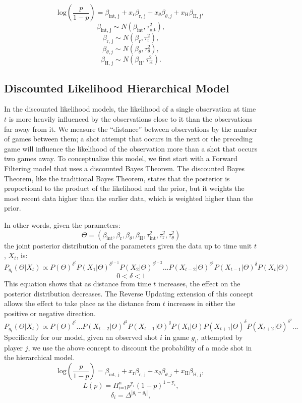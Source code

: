 \documentclass[12pt,twoside]{dukestatscithesis}
\theoremstyle{definition}
\theoremstyle{definition}
\theoremstyle{definition}
\theoremstyle{remark}
\begin{document}
\[
\text{log} \left( \frac{p}{1-p} \right) = 
\beta_{\text{int, j}} +
x_{\text{r}}\beta_{\text{r, j}} +
x_{\theta}\beta_{\theta, j} +
x_{\text{H}}\beta_{\text{H, j}},
\] \[
\beta_{\text{int, j}} \sim N(\beta_{\text{int}}, \tau^2_{\text{int}}),
\] \[
\beta_{\text{r, j}} \sim N(\beta_{\text{r}}, \tau^2_{\text{r}}),
\] \[
\beta_{\theta, j} \sim N(\beta_{\theta}, \tau^2_{\theta}),
\] \[
\beta_{\text{H, j}} \sim N(\beta_{\text{H}}, \tau^2_{\text{H}}).
\]

\subsection{Discounted Likelihood Hierarchical
Model}\label{discounted-likelihood-hierarchical-model}

In the discounted likelihood models, the likelihood of a single
observation at time \(\textit{t}\) is more heavily influenced by the
observations close to it than the observations far away from it. We
measure the ``distance'' between observations by the number of games
between them; a shot attempt that occurs in the next or the preceding
game will influence the likelihood of the observation more than a shot
that occurs two games away. To conceptualize this model, we first start
with a Forward Filtering model that uses a discounted Bayes Theorem. The
discounted Bayes Theorem, like the traditional Bayes Theorem, states
that the posterior is proportional to the product of the likelihood and
the prior, but it weights the most recent data higher than the earlier
data, which is weighted higher than the prior.

In other words, given the parameters: \[
\Theta = (\beta_{\text{int}}, \beta_{\text{r}}, \beta_{\theta}, \beta_\text{H}, \tau^2_{\text{int}}, \tau^2_{\text{r}}, \tau^2_{\theta})
\] the joint posterior distribution of the parameters given the data up
to time unit \(\textit{t}\), \(X_t\), is: \[
P_{g_t}(\Theta | X_t) \propto 
P(\Theta)^{\delta^t}
P(X_1|\Theta)^{\delta^{t-1}}
P(X_2|\Theta)^{\delta^{t-2}}...
P(X_{t-2}|\Theta)^{\delta^2}
P(X_{t-1}|\Theta)^{\delta}
P(X_t|\Theta)
\] \[
0 < \delta < 1
\] This equation shows that as distance from time \(\textit{t}\)
increases, the effect on the posterior distribution decreases. The
Reverse Updating extension of this concept allows the effect to take
place as the distance from \(\textit{t}\) increases in either the
positive or negative direction. \[
P_{g_t}(\Theta | X_t) \propto 
P(\Theta)^{\delta^t}...
P(X_{t-2}|\Theta)^{\delta^2}
P(X_{t-1}|\Theta)^{\delta}
P(X_t|\Theta)
P(X_{t+1}|\Theta)^{\delta}
P(X_{t+2}|\Theta)^{\delta^2}...
\] Specifically for our model, given an observed shot \(\textit{i}\) in
game \(g_i\), attempted by player \(\textit{j}\), we use the above
concept to discount the probability of a made shot in the hierarchical
model. \[
\text{log} \left( \frac{p}{1-p} \right) = 
\beta_{\text{int, j}} +
x_{\text{r}}\beta_{\text{r, j}} +
x_{\theta}\beta_{\theta, j} +
x_{\text{H}}\beta_{\text{H, j}},
\] \[
L(p) = 
\Pi_{\text{i=1}}^\text{n}p^{\text{y}_i} (1 - p)^{1-\text{y}_i},
\] \[
\delta_i = \Delta^{|g_i - g_t|},
\]
\end{document}
